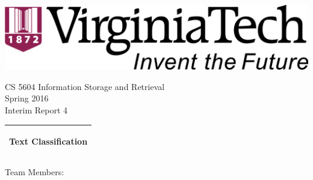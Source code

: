 %
%
%
%
%
\begin{titlepage}
  \addtolength{\hoffset}{0.5\evensidemargin-0.5\oddsidemargin} %
  \noindent%
  \begin{center}
    \includegraphics[width=0.5\textwidth-\tabcolsep]{figures/vt-logo} \\
  \end{center}
  \vspace{0.5cm}
  \begin{center}
    {\Large
      CS 5604 Information Storage and Retrieval \\
      Spring 2016\\
    }
    \vspace{0.2cm}
    {\large
      Interim Report 4%
    }
  \end{center}
  \vspace{0.2cm}
  \begin{tabular}{@{}p{\textwidth}@{}}
    \toprule[2pt]
    \midrule
    \vspace{0.2cm}
    \begin{center}
    \Huge{\textbf{
      Text Classification%
    }}
    \end{center}
    \vspace{0.2cm}\\
    \midrule
    \toprule[2pt]
  \end{tabular}
  \vspace{2 cm}
  \begin{center}
    {\Large
      Team Members:\\
}
\end{center}
\end{titlepage}
